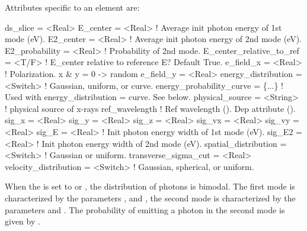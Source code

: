 {
Attributes specific to an  element are:
\begin{example}
  ds_slice                 = <Real>
  E_center                 = <Real>    ! Average init photon energy of 1st mode (eV).
  E2_center                = <Real>    ! Average init photon energy of 2nd mode (eV).
  E2_probability           = <Real>    ! Probability of 2nd mode.
  E_center_relative_to_ref = <T/F>     ! E_center relative to reference E? Default True.
  e_field_x                = <Real>    ! Polarization. x & y = 0 -> random
  e_field_y                = <Real>
  energy_distribution      = <Switch>  ! Gaussian, uniform, or curve.
  energy_probability_curve = \{...\}   ! Used with energy_distribution = curve. See below.
  physical_source          = <String>  ! physical source of x-rays
  ref_wavelength                       ! Ref wavelength (). Dep attribute ().
  sig_x                    = <Real>
  sig_y                    = <Real>
  sig_z                    = <Real>
  sig_vx                   = <Real>
  sig_vy                   = <Real>
  sig_E                    = <Real>    ! Init photon energy width of 1st mode (eV).
  sig_E2                   = <Real>    ! Init photon energy width of 2nd mode (eV).
  spatial_distribution     = <Switch>  ! Gaussian or uniform. 
  transverse_sigma_cut     = <Real>
  velocity_distribution    = <Switch>  ! Gaussian, spherical, or uniform. 
\end{example}

When the  is set to  or , the distribution of
photons is bimodal. The first mode is characterized by the parameters , and ,
the second mode is characterized by the parameters  and . The probability
of emitting a photon in the second mode is given by .

}
